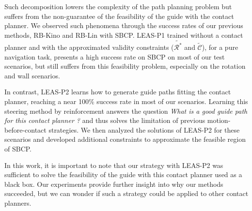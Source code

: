 Such decomposition lowers the complexity of the path planning problem but suffers from the non-guarantee of the feasibility of the guide with the contact planner.
We observed such phenomena through the success rates of our previous methods, RB-Kino and RB-Lin with SBCP.
LEAS-P1 trained without a contact planner and with the approximated validity constraints ($\tilde{\mathcal{R}^*}$ and $\tilde{\mathcal{C}}$), for a pure navigation task, presents a high success rate on SBCP on most of our test scenarios, but still suffers from this feasibility problem, especially on the rotation and wall scenarios.

In contrast, LEAS-P2 learns how to generate guide paths fitting the contact planner, reaching a near 100\% success rate in most of our scenarios. Learning this steering method by reinforcement answers the question \textit{What is a good guide path for this contact planner ?} and thus solves the limitation of previous motion-before-contact strategies.
We then analyzed the solutions of LEAS-P2 for these scenarios and developed additional constraints to approximate the feasible region of SBCP.

In this work, it is important to note that our strategy with LEAS-P2 was sufficient to solve the feasibility of the guide with this contact planner used as a black box.
Our experiments provide further insight into why our methods succeeded, but we can wonder if such a strategy could be applied to other contact planners.

